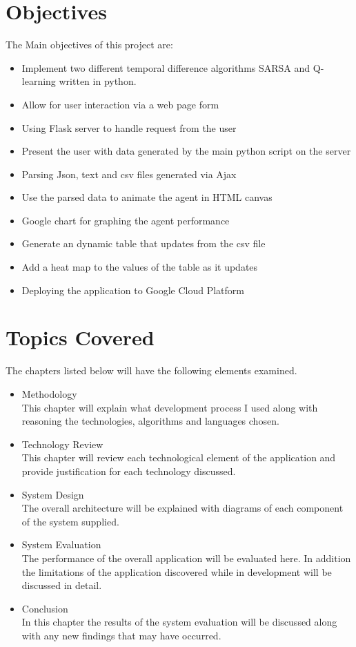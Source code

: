 \section{Objectives}
The Main objectives of this project are:
\begin{itemize}
	\item Implement two different temporal difference algorithms SARSA and Q-learning written in python.
	\item Allow for user interaction via a web page form
	\item Using Flask server to handle request from the user
	\item Present the user with data generated by the main python script on the server 
	\item Parsing Json, text and csv files generated via Ajax
	\item Use the parsed data to animate the agent in HTML canvas
	\item Google chart for graphing the agent performance
	\item Generate an dynamic table that updates from the csv file
	\item Add a heat map to the values of the table as it updates
	\item Deploying the application to Google Cloud Platform

\end{itemize}
 


\section{Topics Covered}
The chapters listed below will have the following elements examined.
\begin{itemize}
	\item Methodology\\
	This chapter will explain what development process I used along with reasoning the technologies, algorithms and languages chosen.
	\item Technology Review\\
	This chapter will review each technological element of the application and provide justification for each technology discussed.
	\item System Design\\
	The overall architecture will be explained with diagrams of each component of the system supplied.
	\item System Evaluation\\
	The performance of the overall application will be evaluated here. In addition the limitations of the application discovered while in development will be discussed in detail.
	\item Conclusion\\
	In this chapter the results of the system evaluation will be discussed along with any new findings that may have occurred.
\end{itemize}
